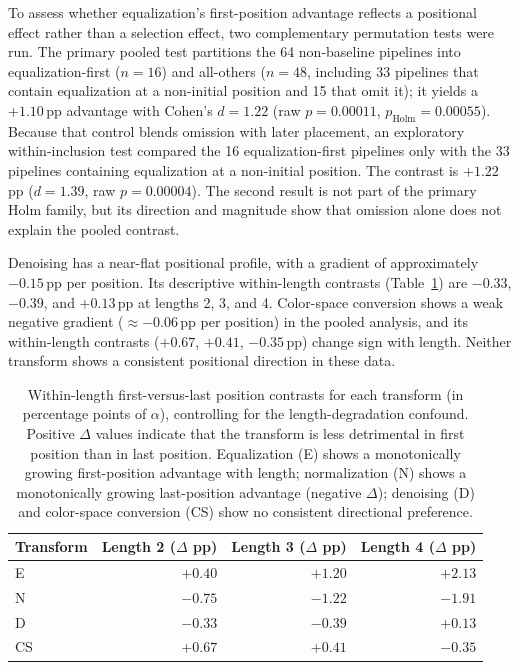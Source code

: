 \documentclass[preprint,review,12pt]{elsarticle}
\begin{document}
To assess whether equalization's first-position advantage reflects a positional effect rather than a selection effect, two complementary permutation tests were run. The primary pooled test partitions the 64 non-baseline pipelines into equalization-first ($n = 16$) and all-others ($n = 48$, including 33 pipelines that contain equalization at a non-initial position and 15 that omit it); it yields a $+1.10$\,pp advantage with Cohen's $d = 1.22$ (raw $p = 0.00011$, $p_{\text{Holm}} = 0.00055$). Because that control blends omission with later placement, an exploratory within-inclusion test compared the 16 equalization-first pipelines only with the 33 pipelines containing equalization at a non-initial position. The contrast is $+1.22$\,pp ($d = 1.39$, raw $p = 0.00004$). The second result is not part of the primary Holm family, but its direction and magnitude show that omission alone does not explain the pooled contrast.

Denoising has a near-flat positional profile, with a gradient of approximately $-0.15$\,pp per position. Its descriptive within-length contrasts (Table~\ref{tab:positional}) are $-0.33$, $-0.39$, and $+0.13$\,pp at lengths 2, 3, and 4. Color-space conversion shows a weak negative gradient ($\approx -0.06$\,pp per position) in the pooled analysis, and its within-length contrasts ($+0.67$, $+0.41$, $-0.35$\,pp) change sign with length. Neither transform shows a consistent positional direction in these data.

\begin{table}[!t]
\caption{Within-length first-versus-last position contrasts for each transform (in percentage points of $\alpha$), controlling for the length-degradation confound. Positive $\Delta$ values indicate that the transform is less detrimental in first position than in last position. Equalization (E) shows a monotonically growing first-position advantage with length; normalization (N) shows a monotonically growing last-position advantage (negative $\Delta$); denoising (D) and color-space conversion (CS) show no consistent directional preference.\label{tab:positional}}
\centering
\footnotesize
\begin{tabular}{l r r r}
\toprule
\textbf{Transform} & \textbf{Length 2 ($\Delta$ pp)} & \textbf{Length 3 ($\Delta$ pp)} & \textbf{Length 4 ($\Delta$ pp)} \\
\midrule
E   & $+0.40$ & $+1.20$ & $+2.13$ \\
N   & $-0.75$ & $-1.22$ & $-1.91$ \\
D   & $-0.33$ & $-0.39$ & $+0.13$ \\
CS  & $+0.67$ & $+0.41$ & $-0.35$ \\
\bottomrule
\end{tabular}
\end{table}
\end{document}
